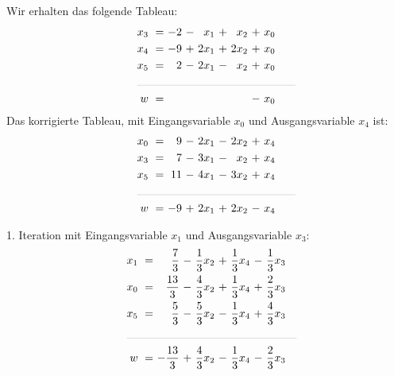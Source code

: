 \documentclass [a4paper,11pt]{article}
\begin{document}
\begin{enumerate}
\begin{enumerate}
            Wir erhalten das folgende Tableau:
            \begin{align*}
            \begin{alignedat}{6}
            && x_3 &\ = &\ -2 &\ - &\  x_1 &\ + &\  x_2 &\ + &\ x_0 \\
            && x_4 &\ = &\ -9 &\ + &\ 2x_1 &\ + &\ 2x_2 &\ + &\ x_0 \\
            && x_5 &\ = &\  2 &\ - &\ 2x_1 &\ - &\  x_2 &\ + &\ x_0 \\
            &\rlap{\rule{5cm}{.1pt}} &&&&&&&&&\\
            && w   &\ = &     &    &       &    &       &\ - &\ x_0
            \end{alignedat}
            \end{align*}
            Das korrigierte Tableau, mit Eingangsvariable $x_0$ und Ausgangsvariable $x_4$ ist:
            \begin{align*}
            \begin{alignedat}{6}
            && x_0 &\ = &\  9 &\ - &\ 2x_1 &\ - &\ 2x_2 &\ + &\ x_4 \\
            && x_3 &\ = &\  7 &\ - &\ 3x_1 &\ - &\  x_2 &\ + &\ x_4 \\
            && x_5 &\ = &\ 11 &\ - &\ 4x_1 &\ - &\ 3x_2 &\ + &\ x_4 \\
            &\rlap{\rule{5cm}{.1pt}} &&&&&&&&&\\
            && w   &\ = &\ -9 &\ + &\ 2x_1 &\ + &\ 2x_2 &\ - &\ x_4
            \end{alignedat}
            \end{align*}

            1. Iteration mit Eingangsvariable $x_1$ und Ausgangsvariable $x_3$:
            \begin{align*}
            \begin{alignedat}{6}
            && x_1 &\ = &\  \frac{7}{3} &\ - &\ \frac{1}{3}x_2 &\ + &\ \frac{1}{3}x_4 &\ - &\ \frac{1}{3}x_3 \\
            && x_0 &\ = &\ \frac{13}{3} &\ - &\ \frac{4}{3}x_2 &\ + &\ \frac{1}{3}x_4 &\ + &\ \frac{2}{3}x_3 \\
            && x_5 &\ = &\  \frac{5}{3} &\ - &\ \frac{5}{3}x_2 &\ - &\ \frac{1}{3}x_4 &\ + &\ \frac{4}{3}x_3 \\
            &\rlap{\rule{5.4cm}{.1pt}} &&&&&&&&&\\
            && w   &\ = &\ -\frac{13}{3} &\ + &\ \frac{4}{3}x_2 &\ - &\ \frac{1}{3}x_4 &\ - &\ \frac{2}{3}x_3
            \end{alignedat}
            \end{align*}


\end{enumerate}
\end{enumerate}
\end{document}
